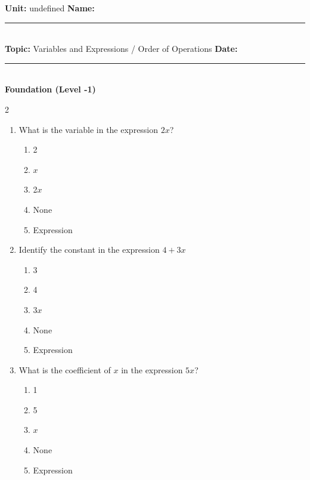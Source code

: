 \documentclass[10pt]{article}
\begin{document}
\enlargethispage{2.5cm}

\begin{tcolorbox}[colback=mainblue!5, colframe=mainblue, sharp corners, boxrule=0.5pt]
    \small \textbf{Unit:} undefined \hfill \textbf{Name:} \rule{3cm}{0.4pt} \\
    \small \textbf{Topic:} Variables and Expressions / Order of Operations \hfill \textbf{Date:} \rule{2cm}{0.4pt} \\
    \centering \textbf{\large Foundation (Level -1)}
\end{tcolorbox}

\vspace{0.2cm}

\begin{multicols}{2}
\begin{enumerate}[label=\textbf{Q\arabic*.}, leftmargin=*, itemsep=6pt, parsep=0pt]

  \item \small What is the variable in the expression $2x$?
  \begin{enumerate}[label=(\Alph*), leftmargin=0.6cm, nosep, itemsep=2pt]
    \item 2
    \item $x$
    \item 2$x$
    \item None
    \item Expression
  \end{enumerate}

  \item \small Identify the constant in the expression $4 + 3x$
  \begin{enumerate}[label=(\Alph*), leftmargin=0.6cm, nosep, itemsep=2pt]
    \item 3
    \item 4
    \item $3x$
    \item None
    \item Expression
  \end{enumerate}

  \item \small What is the coefficient of $x$ in the expression $5x$?
  \begin{enumerate}[label=(\Alph*), leftmargin=0.6cm, nosep, itemsep=2pt]
    \item 1
    \item 5
    \item $x$
    \item None
    \item Expression
  \end{enumerate}


\end{enumerate}
\end{multicols}
\end{document}
